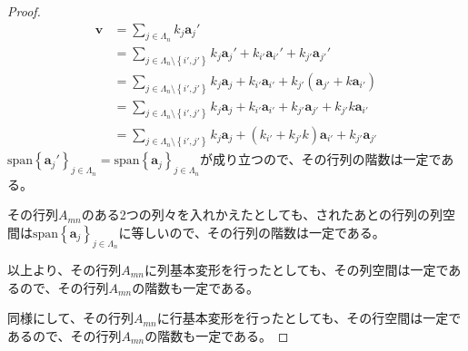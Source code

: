 \documentclass[dvipdfmx]{jsarticle}
\begin{document}
\begin{proof}
\begin{align*}
\mathbf{v} &= \sum_{j \in \varLambda_{n}} {k_{j}\mathbf{a}_{j}'}\\
&= \sum_{j \in \varLambda_{n} \setminus \left\{ i',j' \right\}} {k_{j}\mathbf{a}_{j}'} + k_{i'}\mathbf{a}_{i'}' + k_{j'}\mathbf{a}_{j'}'\\
&= \sum_{j \in \varLambda_{n} \setminus \left\{ i',j' \right\}} {k_{j}\mathbf{a}_{j}} + k_{i'}\mathbf{a}_{i'} + k_{j'}\left( \mathbf{a}_{j'} + k\mathbf{a}_{i'} \right)\\
&= \sum_{j \in \varLambda_{n} \setminus \left\{ i',j' \right\}} {k_{j}\mathbf{a}_{j}} + k_{i'}\mathbf{a}_{i'} + k_{j'}\mathbf{a}_{j'} + k_{j'}k\mathbf{a}_{i'}\\
&= \sum_{j \in \varLambda_{n} \setminus \left\{ i',j' \right\}} {k_{j}\mathbf{a}_{j}} + \left( k_{i'} + k_{j'}k \right)\mathbf{a}_{i'} + k_{j'}\mathbf{a}_{j'}
\end{align*}
${\mathrm{span}}\left\{ \mathbf{a}_{j}' \right\}_{j \in \varLambda_{n}} = {\mathrm{span}}\left\{ \mathbf{a}_{j} \right\}_{j \in \varLambda_{n}}$が成り立つので、その行列の階数は一定である。\par
その行列$A_{mn}$のある2つの列々を入れかえたとしても、されたあとの行列の列空間は${\mathrm{span}}\left\{ \mathbf{a}_{j} \right\}_{j \in \varLambda_{n}}$に等しいので、その行列の階数は一定である。\par
以上より、その行列$A_{mn}$に列基本変形を行ったとしても、その列空間は一定であるので、その行列$A_{mn}$の階数も一定である。\par
同様にして、その行列$A_{mn}$に行基本変形を行ったとしても、その行空間は一定であるので、その行列$A_{mn}$の階数も一定である。
\end{proof}
\end{document}
